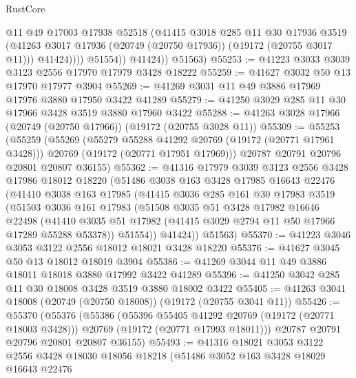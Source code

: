 \begin{lexlean}{RustCore}
\begin{coremodule}
                    @11
                    @49
                    @17003
                    @17938
                    @52518
                    (@41415
                      @3018
                      @285
                      @11
                      @30
                      @17936
                      @3519
                      (@41263 @3017 @17936 (@20749 (@20750 @17936)) (@19172 (@20755 @3017 @11)))
                      @41424))))
              @51554))
          @41424))
      @51563)
@55253 := @41223 @3033 @3039 @3123 @2556 @17970 @17979 @3428 @18222
@55259 := @41627 @3032 @50 @13 @17970 @17977 @3904
@55269 := @41269 @3031 @11 @49 @3886 @17969 @17976 @3880 @17950 @3422 @41289
@55279 := @41250 @3029 @285 @11 @30 @17966 @3428 @3519 @3880 @17960 @3422
@55288 := @41263 @3028 @17966 (@20749 (@20750 @17966)) (@19172 (@20755 @3028 @11))
@55309 := @55253
    (@55259
      (@55269
        (@55279 @55288 @41292 @20769 (@19172 (@20771 @17961 @3428)))
        @20769
        (@19172 (@20771 @17951 @17969)))
      @20787
      @20791
      @20796
      @20801
      @20807
      @36155)
@55362 := @41316
    @17979
    @3039
    @3123
    @2556
    @3428
    @17986
    @18012
    @18220
    (@51486
      @3038
      @163
      @3428
      @17985
      @16643
      @22476
      (@41410
        @3038
        @163
        @17985
        (@41415
          @3036
          @285
          @161
          @30
          @17983
          @3519
          (@51503
            @3036
            @161
            @17983
            (@51508
              @3035
              @51
              @3428
              @17982
              @16646
              @22498
              (@41410 @3035 @51 @17982 (@41415 @3029 @2794 @11 @50 @17966 @17289 @55288 @53378))
              @51554))
          @41424))
      @51563)
@55370 := @41223 @3046 @3053 @3122 @2556 @18012 @18021 @3428 @18220
@55376 := @41627 @3045 @50 @13 @18012 @18019 @3904
@55386 := @41269 @3044 @11 @49 @3886 @18011 @18018 @3880 @17992 @3422 @41289
@55396 := @41250 @3042 @285 @11 @30 @18008 @3428 @3519 @3880 @18002 @3422
@55405 := @41263 @3041 @18008 (@20749 (@20750 @18008)) (@19172 (@20755 @3041 @11))
@55426 := @55370
    (@55376
      (@55386
        (@55396 @55405 @41292 @20769 (@19172 (@20771 @18003 @3428)))
        @20769
        (@19172 (@20771 @17993 @18011)))
      @20787
      @20791
      @20796
      @20801
      @20807
      @36155)
@55493 := @41316
    @18021
    @3053
    @3122
    @2556
    @3428
    @18030
    @18056
    @18218
    (@51486
      @3052
      @163
      @3428
      @18029
      @16643
      @22476

\end{coremodule}
\end{lexlean}
